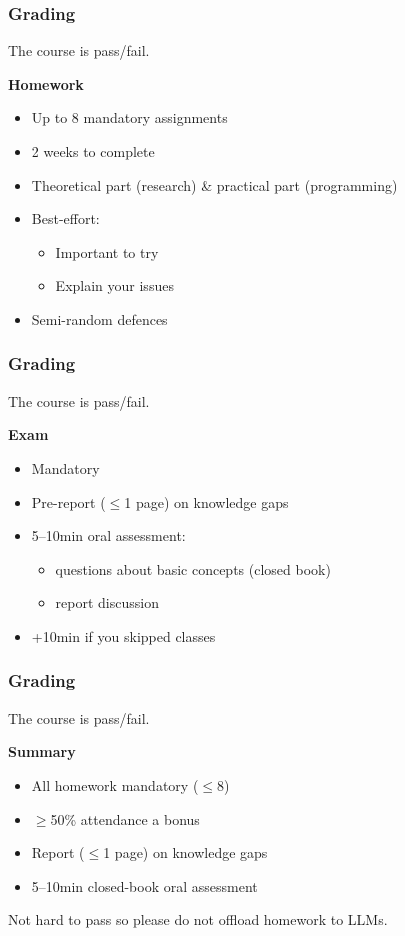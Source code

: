 \begin{frame}
  \frametitle{Grading}

  The course is pass/fail.

  \vspace*{1em}

  \pause
  \textbf{Homework}
  \begin{itemize}[<+->]
    \item Up to 8 mandatory assignments
    \item 2 weeks to complete
    \item Theoretical part (research) \& practical part (programming)
    \item Best-effort:
    \begin{itemize}
      \item Important to try
      \item Explain your issues
    \end{itemize}
    \item Semi-random defences
  \end{itemize}
\end{frame}

\begin{frame}
  \frametitle{Grading}

  The course is pass/fail.

  \vspace*{1em}

  \textbf{Exam}
  \begin{itemize}[<+->]
    \item Mandatory
    \item Pre-report ($\le$1 page) on knowledge gaps
    \item 5--10min oral assessment:
    \begin{itemize}
      \item questions about basic concepts (closed book)
      \item report discussion
    \end{itemize}
    \item +10min if you skipped classes
  \end{itemize}
\end{frame}

\begin{frame}
  \frametitle{Grading}

  The course is pass/fail.

  \vspace*{1em}

  \textbf{Summary}
  \begin{itemize}
    \item All homework mandatory ($\le$8)
    \item $\ge$50\% attendance a bonus
    \item Report ($\le$1 page) on knowledge gaps
    \item 5--10min closed-book oral assessment
  \end{itemize}

  \vspace*{1em}

  \pause
  Not hard to pass so please do not offload homework to LLMs.
\end{frame}

